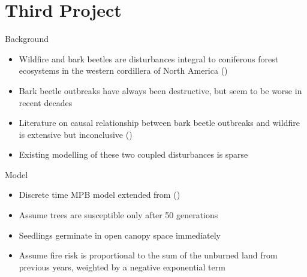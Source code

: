 \documentclass{beamer}
\begin{document}
\section{Third Project}
\begin{frame}{Background}
    \begin{itemize}
        \item Wildfire and bark beetles are disturbances integral to coniferous forest ecosystems in the western cordillera of North America (\cite{kaufmann2008status})
        \item Bark beetle outbreaks have always been destructive, but seem to be worse in recent decades
        \item Literature on causal relationship between bark beetle outbreaks and wildfire is extensive but inconclusive (\citet{axelson2009influence})
        \item Existing modelling of these two coupled disturbances is sparse
    \end{itemize}
\end{frame}

\begin{frame}{Model}
    \begin{itemize}
        \item Discrete time MPB model extended from (\citet{duncan2015model})
        \item Assume trees are susceptible only after 50 generations
        \item Seedlings germinate in open canopy space immediately 
        \item Assume fire risk is proportional to the sum of the unburned land from previous years, weighted by a negative exponential term
    \end{itemize}
\end{frame}
\end{document}
